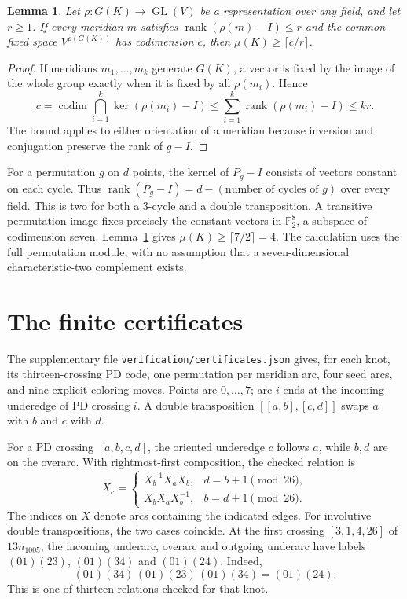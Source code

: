 \documentclass[11pt]{amsart}
\newtheorem{lemma}[theorem]{Lemma}
\theoremstyle{remark}
\newcommand{\F}{\mathbb F}
\newcommand{\GL}{\operatorname{GL}}
\begin{document}
\begin{lemma}\label{lem:rank}
Let $\rho:G(K)\to\GL(V)$ be a representation over any field, and let $r\ge1$. If every meridian $m$ satisfies $\operatorname{rank}(\rho(m)-I)\le r$ and the common fixed space $V^{\rho(G(K))}$ has codimension $c$, then $\mu(K)\ge\lceil c/r\rceil$.
\end{lemma}

\begin{proof}
If meridians $m_1,\ldots,m_k$ generate $G(K)$, a vector is fixed by the image of the whole group exactly when it is fixed by all $\rho(m_i)$. Hence
\[
  c=\operatorname{codim}\bigcap_{i=1}^k\ker(\rho(m_i)-I)
  \le\sum_{i=1}^k\operatorname{rank}(\rho(m_i)-I)\le kr.
\]
The bound applies to either orientation of a meridian because inversion and conjugation preserve the rank of $g-I$.
\end{proof}

For a permutation $g$ on $d$ points, the kernel of $P_g-I$ consists of vectors constant on each cycle. Thus $\operatorname{rank}(P_g-I)=d-(\text{number of cycles of }g)$ over every field. This is two for both a $3$-cycle and a double transposition. A transitive permutation image fixes precisely the constant vectors in $\F_2^8$, a subspace of codimension seven. Lemma~\ref{lem:rank} gives $\mu(K)\ge\lceil7/2\rceil=4$. The calculation uses the full permutation module, with no assumption that a seven-dimensional characteristic-two complement exists.

\section{The finite certificates}

The supplementary file \texttt{verification/certificates.json} gives, for each knot, its thirteen-crossing PD code, one permutation per meridian arc, four seed arcs, and nine explicit coloring moves. Points are $0,\ldots,7$; arc $i$ ends at the incoming underedge of PD crossing $i$. A double transposition $[[a,b],[c,d]]$ swaps $a$ with $b$ and $c$ with $d$.

For a PD crossing $[a,b,c,d]$, the oriented underedge $c$ follows $a$, while $b,d$ are on the overarc. With rightmost-first composition, the checked relation is
\[
  X_c=\begin{cases}
  X_b^{-1}X_aX_b,&d=b+1\pmod{26},\\
  X_bX_aX_b^{-1},&b=d+1\pmod{26}.
  \end{cases}
\]
The indices on $X$ denote arcs containing the indicated edges. For involutive double transpositions, the two cases coincide. At the first crossing $[3,1,4,26]$ of $13n_{1005}$, the incoming underarc, overarc and outgoing underarc have labels $(01)(23)$, $(01)(34)$ and $(01)(24)$. Indeed,
\[
  (01)(34)\,(01)(23)\,(01)(34)=(01)(24).
\]
This is one of thirteen relations checked for that knot.
\end{document}
